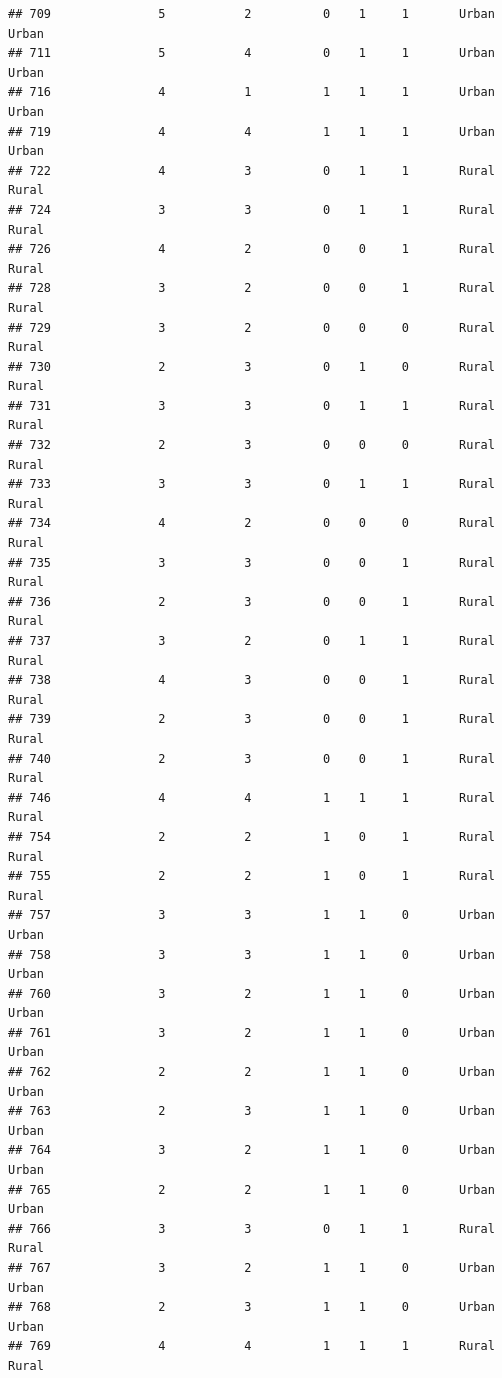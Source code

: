 \documentclass[
]{article}
\begin{document}
\begin{verbatim}
## 709               5           2          0    1     1       Urban Urban
## 711               5           4          0    1     1       Urban Urban
## 716               4           1          1    1     1       Urban Urban
## 719               4           4          1    1     1       Urban Urban
## 722               4           3          0    1     1       Rural Rural
## 724               3           3          0    1     1       Rural Rural
## 726               4           2          0    0     1       Rural Rural
## 728               3           2          0    0     1       Rural Rural
## 729               3           2          0    0     0       Rural Rural
## 730               2           3          0    1     0       Rural Rural
## 731               3           3          0    1     1       Rural Rural
## 732               2           3          0    0     0       Rural Rural
## 733               3           3          0    1     1       Rural Rural
## 734               4           2          0    0     0       Rural Rural
## 735               3           3          0    0     1       Rural Rural
## 736               2           3          0    0     1       Rural Rural
## 737               3           2          0    1     1       Rural Rural
## 738               4           3          0    0     1       Rural Rural
## 739               2           3          0    0     1       Rural Rural
## 740               2           3          0    0     1       Rural Rural
## 746               4           4          1    1     1       Rural Rural
## 754               2           2          1    0     1       Rural Rural
## 755               2           2          1    0     1       Rural Rural
## 757               3           3          1    1     0       Urban Urban
## 758               3           3          1    1     0       Urban Urban
## 760               3           2          1    1     0       Urban Urban
## 761               3           2          1    1     0       Urban Urban
## 762               2           2          1    1     0       Urban Urban
## 763               2           3          1    1     0       Urban Urban
## 764               3           2          1    1     0       Urban Urban
## 765               2           2          1    1     0       Urban Urban
## 766               3           3          0    1     1       Rural Rural
## 767               3           2          1    1     0       Urban Urban
## 768               2           3          1    1     0       Urban Urban
## 769               4           4          1    1     1       Rural Rural

\end{verbatim}
\end{document}
